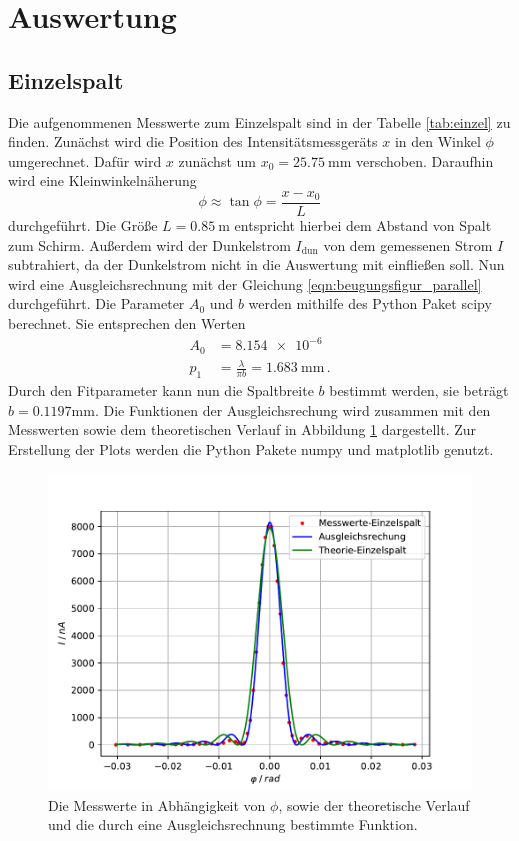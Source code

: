 \section{Auswertung}
\label{sec:Auswertung}
\subsection{Einzelspalt}
Die aufgenommenen Messwerte zum Einzelspalt sind in der Tabelle \ref{tab:einzel} zu finden.
Zunächst wird die Position des Intensitätsmessgeräts $x$ in den Winkel $\phi$ umgerechnet.
Dafür wird $x$ zunächst um $x_0=  \SI{25.75}{\milli\meter}$ verschoben.
Daraufhin wird eine Kleinwinkelnäherung
\begin{equation*}
    \phi \approx \tan{\phi} = \frac{x-x_0}{L}
\end{equation*}
durchgeführt.
Die Größe $L=\SI{0.85}{\metre}$ entspricht hierbei dem Abstand von Spalt zum Schirm.
Außerdem wird der Dunkelstrom $I_\text{dun}$ von dem gemessenen Strom $I$ subtrahiert, da der Dunkelstrom nicht in die Auswertung mit einfließen soll.
Nun wird eine Ausgleichsrechnung mit der Gleichung \ref{eqn:beugungsfigur_parallel} durchgeführt.
Die Parameter $A_0$ und $b$ werden mithilfe des Python Paket scipy \cite{scipy} berechnet.
Sie entsprechen den Werten
\begin{align*}
    A_0 &= \SI{8.154e-6}{}\\ 
    p_1 &= \frac{\lambda}{\pi b} = \SI{1.683}{\milli\meter} \, .
\end{align*}
Durch den Fitparameter kann nun die Spaltbreite $b$ bestimmt werden, sie beträgt $b = 0.1197 \si{\milli\meter}$.
Die Funktionen der Ausgleichsrechung wird zusammen mit den Messwerten sowie dem theoretischen Verlauf in Abbildung \ref{fig:einzel} dargestellt.
Zur Erstellung der Plots werden die Python Pakete numpy \cite{numpy} und matplotlib \cite{matplotlib} genutzt.

\begin{figure}
    \centering
    \includegraphics[width=\textwidth]{content/data/einzelspalt.pdf}
    \caption{Die Messwerte in Abhängigkeit von $\phi$, sowie der theoretische Verlauf und die durch eine Ausgleichsrechnung bestimmte Funktion.}
    \label{fig:einzel}
\end{figure}


